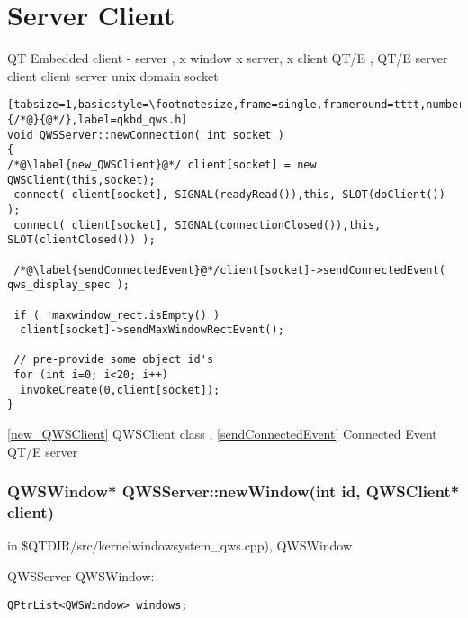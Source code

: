 \chapter{Server {\MaQ{}} Client {\MbQ{}}}

QT Embedded {\MbQ{}} client - server {\MgQ{}}, {\McQ{}} x window {\MbQ{}} x server, x
client{\MaQ{}} {\MbQ{}} QT/E {\McQ{}}, {\McQ{}} QT/E {\McQ{}} server {\MaQ{}} client{\MaQ{}}\zZ
{\McQ{}} client {\MaQ{}} server {\MbQ{}} unix domain socket {\MaQ{}}\zZ

\begin{lstlisting}[tabsize=1,basicstyle=\footnotesize,frame=single,frameround=tttt,numbers=left,breaklines=true,title=\$QTDIR/src/embedded/qwindowsystem\_{}qws.cpp,escapeinside={/*@}{@*/},label=qkbd_qws.h]
void QWSServer::newConnection( int socket )
{
/*@\label{new_QWSClient}@*/ client[socket] = new QWSClient(this,socket);
 connect( client[socket], SIGNAL(readyRead()),this, SLOT(doClient()) );
 connect( client[socket], SIGNAL(connectionClosed()),this, SLOT(clientClosed()) );

 /*@\label{sendConnectedEvent}@*/client[socket]->sendConnectedEvent( qws_display_spec );

 if ( !maxwindow_rect.isEmpty() )
  client[socket]->sendMaxWindowRectEvent();

 // pre-provide some object id's
 for (int i=0; i<20; i++)
  invokeCreate(0,client[socket]);
}
\end{lstlisting}

\bigskip
{\McQ{}} \ref{new_QWSClient} {\McQ{}} QWSClient class {\MbQ{}},
{\MaQ{}} \ref{sendConnectedEvent} {\McQ{}} Connected Event {\MaQ{}} QT/E server {\McQ{}}\zZ

\subsection*{QWSWindow* QWSServer::newWindow(int id, QWSClient* client)}
in \$QTDIR/src/kernelwindowsystem\_{}qws.cpp),
{\MbQ{}} QWSWindow{\MaQ{}}\zZ

QWSServer {\MbQ{}} QWSWindow:
\begin{verbatim}
QPtrList<QWSWindow> windows;
\end{verbatim}
